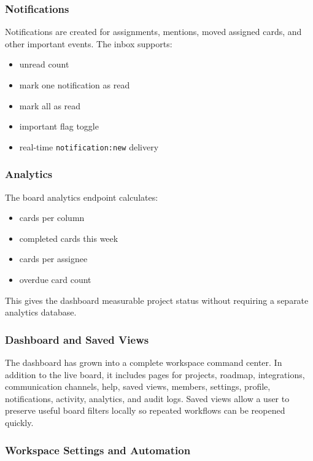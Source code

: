 \documentclass[
]{article}
\providecommand{\tightlist}{%
  \setlength{\itemsep}{0pt}\setlength{\parskip}{0pt}}
\begin{document}
\subsubsection{Notifications}\label{notifications}

Notifications are created for assignments, mentions, moved assigned
cards, and other important events. The inbox supports:

\begin{itemize}
\tightlist
\item
  unread count
\item
  mark one notification as read
\item
  mark all as read
\item
  important flag toggle
\item
  real-time \texttt{notification:new} delivery
\end{itemize}

\subsubsection{Analytics}\label{analytics}

The board analytics endpoint calculates:

\begin{itemize}
\tightlist
\item
  cards per column
\item
  completed cards this week
\item
  cards per assignee
\item
  overdue card count
\end{itemize}

This gives the dashboard measurable project status without requiring a
separate analytics database.

\subsubsection{Dashboard and Saved
Views}\label{dashboard-and-saved-views}

The dashboard has grown into a complete workspace command center. In
addition to the live board, it includes pages for projects, roadmap,
integrations, communication channels, help, saved views, members,
settings, profile, notifications, activity, analytics, and audit logs.
Saved views allow a user to preserve useful board filters locally so
repeated workflows can be reopened quickly.

\subsubsection{Workspace Settings and
Automation}\label{workspace-settings-and-automation}
\end{document}
